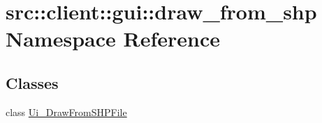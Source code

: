\hypertarget{namespacesrc_1_1client_1_1gui_1_1draw__from__shp}{
\section{src::client::gui::draw\_\-from\_\-shp Namespace Reference}
\label{namespacesrc_1_1client_1_1gui_1_1draw__from__shp}
}
\subsection*{Classes}
\begin{DoxyCompactItemize}
\item 
class \hyperlink{classsrc_1_1client_1_1gui_1_1draw__from__shp_1_1Ui__DrawFromSHPFile}{Ui\_\-DrawFromSHPFile}
\end{DoxyCompactItemize}
